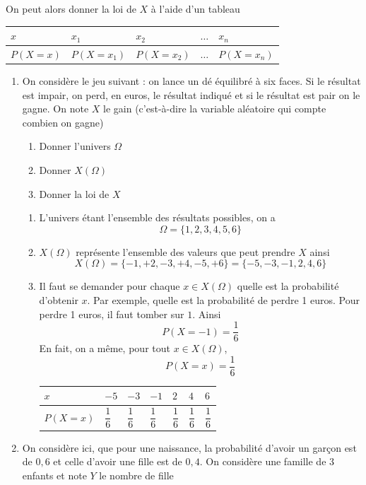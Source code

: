 On peut alors donner la loi de $X$ à l'aide d'un tableau\newline


\begin{tabularx}{\linewidth}{| X | X | X | X | X |}
\hline
$x$ & $x_1$ & $x_2$ & $\ldots$ & $x_n$ \\ \hline
$P(X=x)$ & $P(X=x_1)$ & $P(X=x_2)$ & $\ldots$ & $P(X=x_n)$\\ \hline
\end{tabularx}\newline


\begin{exemples}
\begin{enumerate}
\item 
On considère le jeu suivant : on lance un dé équilibré à six faces. Si le résultat est impair, on perd, en euros, le résultat indiqué et si le résultat est pair on le gagne. On note $X$ le gain (c'est-à-dire la variable aléatoire qui compte combien on gagne)
\begin{enumerate}
\item Donner l'univers $\Omega$
\item Donner $X(\Omega)$
\item Donner la loi de $X$
\end{enumerate}
\begin{enumerate}
\item L'univers étant l'ensemble des résultats possibles, on a $$\Omega = \{1,2,3,4,5,6\}$$
\item $X(\Omega)$ représente l'ensemble des valeurs que peut prendre $X$ ainsi $$X(\Omega) = \{-1,+2,-3,+4,-5,+6\} = \{-5,-3,-1,2,4,6\}$$
\item Il faut se demander pour chaque $x\in X(\Omega)$ quelle est la probabilité d'obtenir $x$. Par exemple, quelle est la probabilité de perdre 1 euros. Pour perdre 1 euros, il faut tomber sur $1$. Ainsi $$P(X=-1) = \dfrac{1}{6}$$En fait, on a même, pour tout $x\in X(\Omega)$, $$P(X=x) = \dfrac{1}{6}$$
\begin{tabularx}{\linewidth}{| X | X | X | X | X | X | X |}
\hline
$x$ & $-5$ & $-3$ & $-1$ & $2$ & $4$ & $6$ \\ \hline
$P(X=x)$ & $\dfrac{1}{6}$ & $\dfrac{1}{6}$ & $\dfrac{1}{6}$ & $\dfrac{1}{6}$ & $\dfrac{1}{6}$ & $\dfrac{1}{6}$ \rule[-7pt]{0pt}{20pt} \\ \hline
\end{tabularx}\newline
\end{enumerate}
\item On considère ici, que pour une naissance, la probabilité d'avoir un garçon est de $0,6$ et celle d'avoir une fille est de $0,4$. On considère une famille de $3$ enfants et note $Y$ le nombre de fille 

\end{enumerate}
\end{exemples}
